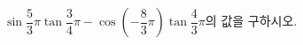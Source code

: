 $\sin\dfrac{5}{3}\pi\tan\dfrac{3}{4}\pi-\cos\left(-\dfrac{8}{3}\pi\right)\tan\dfrac{4}{3}\pi$의 값을 구하시오.
